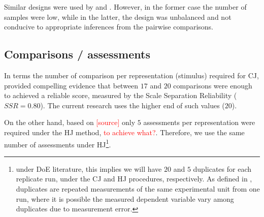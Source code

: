 Similar designs were used by \citet{Boonen_et_al_2020} and \citet{Faes_et_al_2021}. However, in the former case the number of samples were low, while in the latter, the design was unbalanced and not conducive to appropriate inferences from the pairwise comparisons.
%
%
\subsection{Comparisons / assessments}
%
In terms the number of comparison per representation (stimulus) required for CJ, \citet{Verhavert_2018} provided compelling evidence that between $17$ and $20$ comparisons were enough to achieved a reliable score, measured by the Scale Separation Reliability ($SSR=0.80$). The current research uses the higher end of such values ($20$). 

On the other hand, based on \textcolor{red}{[source]} only $5$ assessments per representation were required under the HJ method, \textcolor{red}{to achieve what?}. Therefore, we use the same number of assessments under HJ\footnote{under DoE literature, this implies we will have $20$ and $5$ duplicates for each replicate run, under the CJ and HJ procedures, respectively. As defined in \citet{Lawson_2015}, duplicates are repeated measurements of the same experimental unit from one run, where it is possible the measured dependent variable vary among duplicates due to measurement error.}.
%
%
